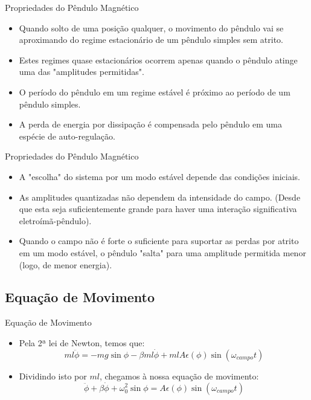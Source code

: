 \documentclass{beamer}
\begin{document}
\begin{frame}{Propriedades do Pêndulo Magnético}
\begin{itemize}
\item Quando solto de uma posição qualquer, o movimento do pêndulo vai se aproximando do regime estacionário de um pêndulo simples sem atrito.
\item Estes regimes quase estacionários ocorrem apenas quando o pêndulo atinge uma das "amplitudes permitidas". 
\item O período do pêndulo em um regime estável é próximo ao período de um pêndulo simples.
\item A perda de energia por dissipação é compensada pelo pêndulo em uma espécie de auto-regulação.
\end{itemize}
\end{frame}

\begin{frame}{Propriedades do Pêndulo Magnético}
\begin{itemize}
\item A "escolha" do sistema por um modo estável depende das condições iniciais.
\item As amplitudes quantizadas não dependem da intensidade do campo. (Desde que esta seja suficientemente grande para haver uma interação significativa eletroímã-pêndulo).
\item Quando o campo não é forte o suficiente para suportar as perdas por atrito em um modo estável, o pêndulo "salta" para uma amplitude permitida menor (logo, de menor energia).
\end{itemize}
\end{frame}
\subsection{Equação de Movimento}
\begin{frame}{Equação de Movimento}
\begin{itemize}
\item Pela 2ª lei de Newton, temos que: $$ ml\ddot{\phi} =  -mg\sin \phi - \beta m l \dot{\phi} + m l A \epsilon(\phi) \sin(\omega_{campo} t)   $$ 
\item Dividindo isto por $ml$, chegamos à nossa equação de movimento:
\begin{equation}\label{eq_mov}
\ddot{\phi} + \beta \dot{\phi} + \omega_0^2 \sin \phi  =  A \epsilon(\phi) \sin(\omega_{campo} t) 
\end{equation}
\end{itemize}
\end{frame}
\end{document}
